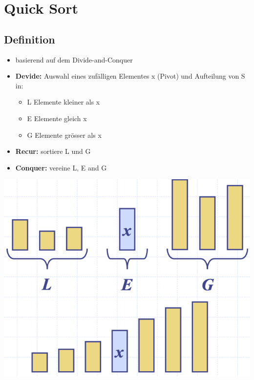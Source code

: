 \section{Quick Sort}


\subsection{Definition}
\begin{itemize}
    \item basierend auf dem Divide-and-Conquer
    \item \textbf{Devide:} Auswahl eines zufälligen Elementes x (Pivot) und Aufteilung von S in:
    \begin{itemize}
        \item L Elemente kleiner als x
        \item E Elemente gleich x
        \item G Elemente grösser als x
    \end{itemize}
    \item \textbf{Recur:} sortiere L und G
    \item \textbf{Conquer:} vereine L, E and G
\end{itemize}
\vspace{-8pt}
\begin{center}
    \includegraphics[scale=.3]{graphic/05 QuickSort/def.png}
\end{center}
\vspace{-8pt}


